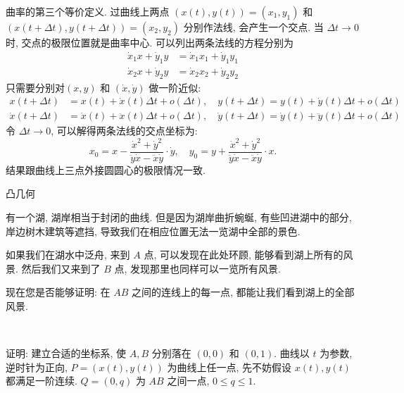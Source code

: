 曲率的第三个等价定义. 过曲线上两点 $(x(t),y(t)) = (x_1,y_1)$ 和 $(x(t+\Delta t), y(t+\Delta t)) = (x_2,y_2)$ 分别作法线, 会产生一个交点. 当 $\Delta t\to 0$ 时, 交点的极限位置就是曲率中心. 可以列出两条法线的方程分别为
\begin{align*}
\dot{x}_1 x + \dot{y}_1 y &= \dot{x}_1 x_1 + \dot{y}_1 y_1 \\
\dot{x}_2 x + \dot{y}_2 y &= \dot{x}_2 x_2 + \dot{y}_2 y_2 
\end{align*}
只需要分别对$(x,y)$ 和 $(\dot{x},\dot{y})$ 做一阶近似:
\begin{align*}
x(t+\Delta t) &= x(t) + \dot{x}(t)\Delta t + o(\Delta t), \quad y(t+\Delta t) = y(t) + \dot{y}(t)\Delta t + o(\Delta t)\\
\dot{x}(t+\Delta t) &= \dot{x}(t) + \ddot{x}(t)\Delta t + o(\Delta t), \quad \dot{y}(t+\Delta t) = \dot{y}(t) + \ddot{y}(t)\Delta t + o(\Delta t)
\end{align*}
令 $\Delta t \to 0$, 可以解得两条法线的交点坐标为:
\[ x_0 = x - \frac{\dot{x}^2+\dot{y}^2}{\ddot{y}\dot{x}-\ddot{x}\dot{y}}\cdot\dot{y}, \quad y_0 = y + \frac{\dot{x}^2+\dot{y}^2}{\ddot{y}\dot{x}-\ddot{x}\dot{y}}\cdot{x} .\]
结果跟曲线上三点外接圆圆心的极限情况一致.


\newpage
\noindent 凸几何

有一个湖, 湖岸相当于封闭的曲线. 但是因为湖岸曲折蜿蜒, 有些凹进湖中的部分, 岸边树木建筑等遮挡, 导致我们在相应位置无法一览湖中全部的景色.

如果我们在湖水中泛舟, 来到 $A$ 点, 可以发现在此处环顾, 能够看到湖上所有的风景. 然后我们又来到了 $B$ 点, 发现那里也同样可以一览所有风景.

现在您是否能够证明: 在 $AB$ 之间的连线上的每一点, 都能让我们看到湖上的全部风景.

~

证明: 建立合适的坐标系, 使 $A,B$ 分别落在 $(0,0)$ 和 $(0,1)$. 曲线以 $t$ 为参数, 逆时针为正向, $P=(x(t),y(t))$ 为曲线上任一点, 先不妨假设 $x(t), y(t)$ 都满足一阶连续. $Q = (0, q)$ 为 $AB$ 之间一点, $0\le q \le 1$.
\begin{figure*}[htbp]
\centering
{}
\end{figure*}

